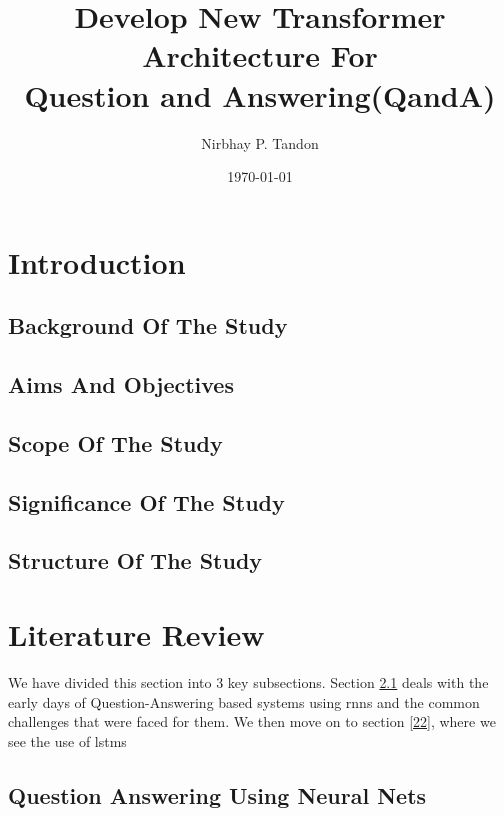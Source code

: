 \documentclass[12pt]{report}
\begin{document}
    \title{Develop New Transformer Architecture For \\ Question and Answering(QandA)}

    \author{Nirbhay P. Tandon}

    \date{\vfill \monthyeardate\today}
        \maketitle


    \newpage
    \newpage
    \tableofcontents
    \newpage
    \listoffigures
    \listoftables

    \chapter{\centering Introduction}\label{c1}
        \section{Background Of The Study}\label{11}
        \section{Aims And Objectives}\label{12}
        \section{Scope Of The Study}\label{13}
        \section{Significance Of The Study}\label{14}
        \section{Structure Of The Study}\label{15}
    \chapter{\centering Literature Review}\label{c2}

    We have divided this section into 3 key subsections. Section \ref{21} deals with the early days of Question-Answering based systems using \acrshort{rnns} and the common challenges that were faced for them. We then move on to section \ref{22}, where we see the use of \acrshort{lstms}
        \section{Question Answering Using Neural Nets}\label{21}
\end{document}
